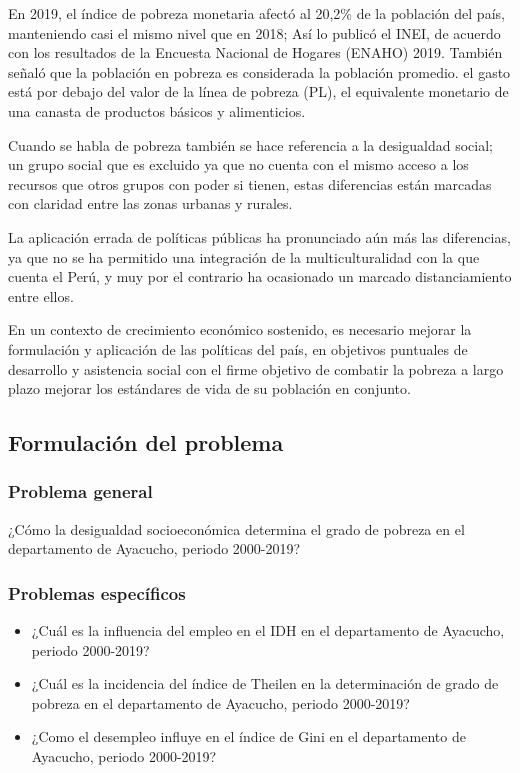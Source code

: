 En 2019, el índice de pobreza monetaria afectó al 20,2\% de la población del país, manteniendo casi el mismo nivel que en 2018; Así lo publicó el INEI, de acuerdo con los resultados de la Encuesta Nacional de Hogares (ENAHO) 2019. También señaló que la población en pobreza es considerada la población promedio. el gasto está por debajo del valor de la línea de pobreza (PL), el equivalente monetario de una canasta de productos básicos y alimenticios.

Cuando se habla de pobreza también se hace referencia a la desigualdad social; un grupo social que es excluido ya que no cuenta con el mismo acceso a los recursos que otros grupos con poder si tienen, estas diferencias están marcadas con claridad entre las zonas urbanas y rurales. 

La aplicación errada de políticas públicas ha pronunciado aún más las diferencias, ya que no se ha permitido una integración de la multiculturalidad con la que cuenta el Perú, y muy por el contrario ha ocasionado un marcado distanciamiento entre ellos.

En un contexto de crecimiento económico sostenido, es necesario mejorar la formulación y aplicación de las políticas del país, en objetivos puntuales de desarrollo y asistencia social con el firme objetivo de combatir la pobreza a largo plazo mejorar los estándares de vida de su población en conjunto.


\subsection{Formulación del problema}

\subsubsection{Problema general}

¿Cómo la desigualdad socioeconómica determina el grado de pobreza en el departamento de Ayacucho, periodo 2000-2019?

\subsubsection{Problemas específicos }

\begin{itemize}

\item ¿Cuál es la influencia del empleo en el IDH en el departamento de Ayacucho, periodo 2000-2019?

\item ¿Cuál es la incidencia del índice de Theilen en la determinación de grado de pobreza en el departamento de Ayacucho, periodo 2000-2019?

\item ¿Como el desempleo influye en el índice de Gini en el departamento de Ayacucho, periodo 2000-2019? 

\end{itemize}




